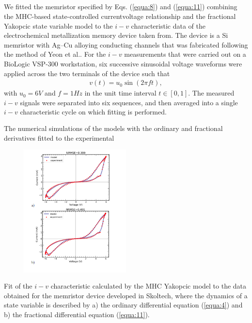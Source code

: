 \documentclass[10pt]{article}
\begin{document}
\begin{multicols}{2}
{        \section{ }
        }
        \bigskip
        We fitted the memristor specified by Eqs. (\ref{equa:8}) and (\ref{equa:11}) combining the MHC-based state-controlled currentvoltage relationship and the fractional Yakopcic state variable model to the $i-v$ characteristic data of the electrochemical metallization memory device taken from. The device is a Si memristor with Ag–Cu alloying conducting channels that was fabricated following the method of Yeon et al.. For the $i-v$ measurements that were carried out on a BioLogic VSP-300 workstation, six successive sinusoidal voltage waveforms were applied across the two terminals of the device such that
        \begin{align}
            v(t) = u_0 \sin(2\pi ft), \label{equa:27}
        \end{align}
        with $u_0 = 6 V$ and $f = 1 Hz$ in the unit time interval $t \in [0,1]$. The measured $i-v$ signals were separated into six sequences, and then averaged into a single $i-v$ characteristic cycle on which fitting is performed. \par
        The numerical simulations of the models with the ordinary and fractional derivatives fitted to the experimental
        \columnbreak
        \begin{figure}
            \includegraphics[width=0.5\textwidth]{NRMSE.png}
        \end{figure}
        \vspace{30em}
        \par
        \medskip
        Fit of the $i-v$ characteristic calculated by the MHC Yakopcic model to the data obtained for the memristor device developed in Skoltech, where the dynamics of a state variable is described by a) the ordinary differential equation (\ref{equa:4}) and b) the fractional differential equation (\ref{equa:11}).

\end{multicols}
\end{document}
